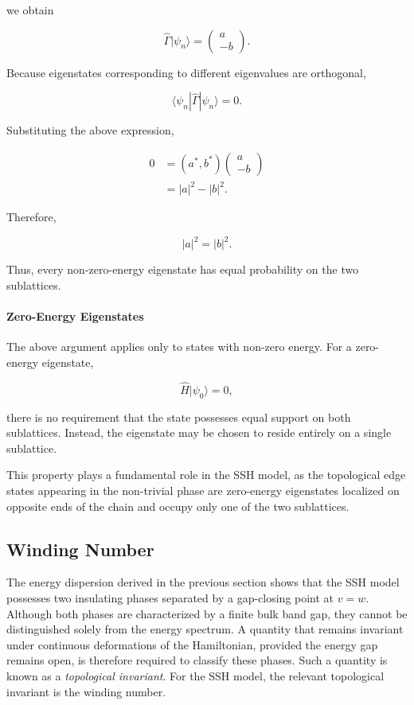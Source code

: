 \documentclass[11pt, a4paper]{article}
\begin{document}
we obtain

\[
\hat{\Gamma}
|\psi_n\rangle
=
\begin{pmatrix}
a\\
-b
\end{pmatrix}.
\]

Because eigenstates corresponding to different eigenvalues are orthogonal,

\begin{equation*}
\langle\psi_n|
\hat{\Gamma}
|\psi_n\rangle
=
0.
\end{equation*}

Substituting the above expression,

\begin{align*}
0
&=
(a^*,b^*)
\begin{pmatrix}
a\\
-b
\end{pmatrix}
\\
&=
|a|^2-|b|^2.
\end{align*}

Therefore,

\begin{equation*}
|a|^2
=
|b|^2.
\end{equation*}

Thus, every non-zero-energy eigenstate has equal probability on the two sublattices.

\paragraph{Zero-Energy Eigenstates}

The above argument applies only to states with non-zero energy. For a zero-energy eigenstate,

\[
\hat{H}|\psi_0\rangle=0,
\]

there is no requirement that the state possesses equal support on both sublattices. Instead, the eigenstate may be chosen to reside entirely on a single sublattice.

This property plays a fundamental role in the SSH model, as the topological edge states appearing in the non-trivial phase are zero-energy eigenstates localized on opposite ends of the chain and occupy only one of the two sublattices.

\subsection{Winding Number}

The energy dispersion derived in the previous section shows that the SSH model possesses two insulating phases separated by a gap-closing point at \(v=w\). Although both phases are characterized by a finite bulk band gap, they cannot be distinguished solely from the energy spectrum. A quantity that remains invariant under continuous deformations of the Hamiltonian, provided the energy gap remains open, is therefore required to classify these phases. Such a quantity is known as a \textit{topological invariant}. For the SSH model, the relevant topological invariant is the winding number.~\cite{asboth2015,hasan2010,qi2011}
\end{document}

